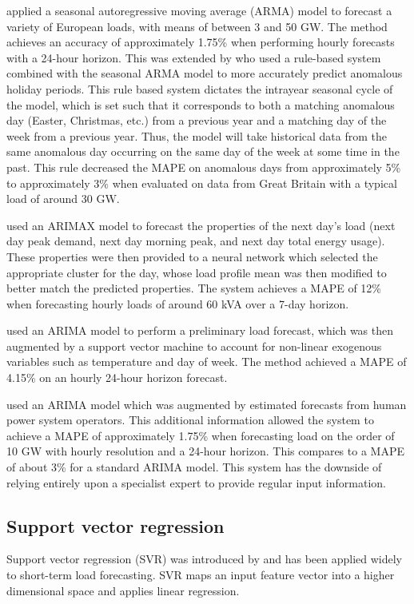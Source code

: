 \citet{Taylor2007} applied a seasonal autoregressive moving average (ARMA) model to forecast a variety of European loads, with means of between 3 and 50 GW.
The method achieves an accuracy of approximately 1.75\% when performing hourly forecasts with a 24-hour horizon.
This was extended by \citet{Arora2013} who used a rule-based system combined with the seasonal ARMA model to more accurately predict anomalous holiday periods.
This rule based system dictates the intrayear seasonal cycle of the model, which is set such that it corresponds to both a matching anomalous day (Easter, Christmas, etc.) from a previous year and a matching day of the week from a previous year.
Thus, the model will take historical data from the same anomalous day occurring on the same day of the week at some time in the past.
This rule decreased the MAPE on anomalous days from approximately 5\% to approximately 3\% when evaluated on data from Great Britain with a typical load of around 30 GW.

\citet{Bennett2014} used an ARIMAX model to forecast the properties of the next day's load (next day peak demand, next day morning peak, and next day total energy usage). These properties were then provided to a neural network which selected the appropriate cluster for the day, whose load profile mean was then modified to better match the predicted properties.
The system achieves a MAPE of 12\% when forecasting hourly loads of around 60 kVA over a 7-day horizon.

\citet{Karthika2017} used an ARIMA model to perform a preliminary load forecast, which was then augmented by a support vector machine to account for non-linear exogenous variables such as temperature and day of week.
The method achieved a MAPE of 4.15\% on an hourly 24-hour horizon forecast.

\citet{Amjady2001} used an ARIMA model which was augmented by estimated forecasts from human power system operators.
This additional information allowed the system to achieve a MAPE of approximately 1.75\% when forecasting load on the order of 10 GW with hourly resolution and a 24-hour horizon.
This compares to a MAPE of about 3\% for a standard ARIMA model.
This system has the downside of relying entirely upon a specialist expert to provide regular input information.

\subsection{Support vector regression}
Support vector regression (SVR) was introduced by \citet{Drucker1996} and has been applied widely to short-term load forecasting.
SVR maps an input feature vector into a higher dimensional space and applies linear regression.

